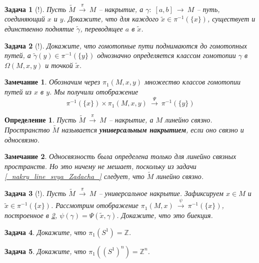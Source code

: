 \documentclass[12pt]{book}
\newcommand{\arrow}{{\:\longrightarrow\:}}
\def\Z{{\mathbb Z}}
\theoremstyle{upshape}
\newtheorem{zadacha}{Задача}[chapter]
\theoremstyle{generic}
\newtheorem{opredelenie}[teorema]{Определение}
\theoremstyle{upshapenonumber}
\newtheorem{zamechanie}{Замечание}[chapter]
\newcommand{\следствие}{%
     \refstepcounter{teorema}
     {\noindent\bf Следствие \thechapter.\arabic{teorema}:\ }}
\newcommand{\пример}{%
     \refstepcounter{teorema}
     {\noindent\bf Пример \thechapter.\arabic{teorema}:\ }}
\newcommand{\лемма}{%
     \refstepcounter{teorema}
     {\noindent\bf Лемма \thechapter.\arabic{teorema}:\ }}
\newcommand{\теорема}{%
     \refstepcounter{teorema}
     {\noindent\bf Теорема \thechapter.\arabic{teorema}:\ }}
\newcommand{\утверждение}{%
     \refstepcounter{teorema}
     {\noindent\bf Утверждение \thechapter.\arabic{teorema}:\ }}
\begin{document}
{\begin{zadacha}[!]
Пусть $\tilde M \stackrel \pi \arrow M$ --
накрытие, а $\gamma:\; [a, b] \arrow M$ --
путь, соединяющий $x$ и $y$.
Докажите, что для каждого $\tilde x\in \pi^{-1}(\{x\})$,
существует и единственно поднятие $\tilde \gamma$,
переводящее $a$  в $\tilde x$.
\end{zadacha}

\begin{zadacha}[!] \label{_konec_puti_Zadacha_}
Докажите, что гомотопные пути поднимаются 
до гомотопных путей, а $\tilde \gamma(y)\in \pi^{-1}(\{y\})$
однозначно определяется классом гомотопии $\gamma$ в
$\Omega(M, x, y)$ и точкой $\tilde x$.
\end{zadacha}

\begin{zamechanie}
Обозначим через $\pi_1(M, x, y)$ множество классов
гомотопии путей из $x$ в $y$. Мы получили отображение 
\[ \pi^{-1}(\{x\})\times \pi_1(M, x, y) \stackrel \Psi\arrow \pi^{-1}(\{y\})
\]
\end{zamechanie}


\begin{opredelenie}
Пусть $\tilde M \stackrel \pi \arrow M$ --
накрытие, а $M$ линейно связно. Пространство $\tilde M$ называется
{\bf универсальным накрытием}, если оно связно и односвязно.
\end{opredelenie}

\begin{zamechanie} 
Односвязность была определена только для линейно
связных пространств. Но это ничему не мешает, поскольку
из задачи \ref{_nakry_line_svya_Zadacha_} 
следует, что $\tilde M$ линейно связно.
\end{zamechanie}

\begin{zadacha}[!]
Пусть $\tilde M\stackrel \pi  \arrow M$ --
универсальное накрытие. Зафиксируем
$x\in M$ и $\tilde x\in \pi^{-1}(\{x\})$.
Рассмотрим отображение 
$\pi_1(M, x) \stackrel \psi \arrow \pi^{-1}(\{x\})$,
построенное в \ref{_konec_puti_Zadacha_},
$\psi(\gamma) = \Psi(\tilde x, \gamma)$.
Докажите, что это биекция.
\end{zadacha}

\begin{zadacha} 
Докажите, что $\pi_1(S^1) = \Z$.
\end{zadacha}

\begin{zadacha} Докажите, что $\pi_1((S^1)^n) = \Z^n$.
\end{zadacha}

}
\end{document}
